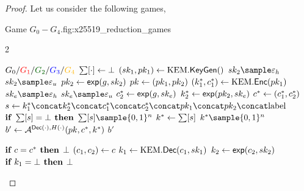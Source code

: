 \begin{proof}
    Let us consider the following games,

    \begin{gamefigure}{Game $G_0 - G_4$.}{fig:x25519_reduction_games}
        \begin{games}{2}
            \begin{gameenv}{\game $G_0 / \textcolor{\gone}{G_1} / \textcolor{\gtwo}{G_2} / \textcolor{\gthree}{G_3} / \textcolor{\gfour}{G_4}$}
                \State $\sum[\cdot] \leftarrow \bot$
                \State $(sk_1, pk_1) \leftarrow \text{KEM}.\textsf{KeyGen}()$
                \State $\sk_2 \sample \honestexponent$
                \BeginBox[draw=\gone]
                \State $\sk_2 \sample \exponent$
                \EndBox
                \State $pk_2 \leftarrow \textsf{exp}(g, sk_2)$
                \State $pk \leftarrow (pk_1, pk_2)$
                \State $(k^*_1, c^*_1) \leftarrow \text{KEM}.\textsf{Enc}(pk_1)$
                \State $\sk_e \sample \honestexponent$
                \BeginBox[draw=\gone]
                \State $\sk_e \sample \exponent$
                \EndBox
                \State $c^*_2 \leftarrow \textsf{exp}(g, sk_e)$
                \State $k^*_2 \leftarrow \textsf{exp}(pk_2, sk_e)$
                \State $c^* \leftarrow (c^*_1, c^*_2)$
                \State $s \assign k^*_1 \concat k^*_2 \concat c^*_1 \concat c^*_2 \concat \pk_1 \concat \pk_2 \concat \text{label}$
                \State $\textbf{if } \sum[s] = \bot \textbf{ then}$
                    \State \quad $\ROMtable[s] \sample \bits^{n}$
                    \State $k^* \leftarrow \sum[s]$
                    \BeginBox[draw=\gfour]
                    \State $k^* \sample \bits^{n}$
                    \EndBox
                    \State $b' \leftarrow \mathcal{A}^{\textsf{Dec}(\cdot), H(\cdot)}(pk, c^*, k^*)$
                    \State \Return $b'$
                \end{gameenv}
                \gamebreak
                \begin{gameenv}{\oracledec}
                    \State $\textbf{if } c = c^* \textbf{ then}$
                        \State \quad \Return $\bot$
                        \State $(c_1, c_2) \leftarrow c$
                        \State $k_1 \leftarrow \text{KEM}.\textsf{Dec}(c_1, sk_1)$
                        \State $k_2 \leftarrow \textsf{exp}(c_2, sk_2)$
                        \State $\textbf{if } k_1 = \bot \textbf{ then}$
                            \State \quad \Return $\bot$
                            \BeginBox[draw=\gthree]

\end{gameenv}
\end{games}
\end{gamefigure}
\end{proof}
